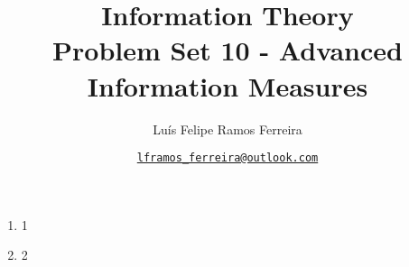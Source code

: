 \documentclass{article}
\title{Information Theory \\ \large Problem Set 10 - Advanced Information Measures}
\author{Luís Felipe Ramos Ferreira}
\date{\href{mailto:lframos\_ferreira@outlook.com}{\texttt{lframos\_ferreira@outlook.com}}
}
\begin{document}
\maketitle

\begin{enumerate}
	\item 1
	\item 2
\end{enumerate}


\nocite{*}
\end{document}
